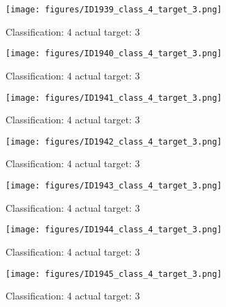 \begin{figure}[h!]
\begin{center}
\texttt{[image: figures/ID1939\_class\_4\_target\_3.png]}
\end{center}
\caption{ Classification: 4 actual target: 3}
\label{fig:ID1939_class_4_target_3}
\end{figure}
\begin{figure}[h!]
\begin{center}
\texttt{[image: figures/ID1940\_class\_4\_target\_3.png]}
\end{center}
\caption{ Classification: 4 actual target: 3}
\label{fig:ID1940_class_4_target_3}
\end{figure}
\begin{figure}[h!]
\begin{center}
\texttt{[image: figures/ID1941\_class\_4\_target\_3.png]}
\end{center}
\caption{ Classification: 4 actual target: 3}
\label{fig:ID1941_class_4_target_3}
\end{figure}
\begin{figure}[h!]
\begin{center}
\texttt{[image: figures/ID1942\_class\_4\_target\_3.png]}
\end{center}
\caption{ Classification: 4 actual target: 3}
\label{fig:ID1942_class_4_target_3}
\end{figure}
\begin{figure}[h!]
\begin{center}
\texttt{[image: figures/ID1943\_class\_4\_target\_3.png]}
\end{center}
\caption{ Classification: 4 actual target: 3}
\label{fig:ID1943_class_4_target_3}
\end{figure}
\begin{figure}[h!]
\begin{center}
\texttt{[image: figures/ID1944\_class\_4\_target\_3.png]}
\end{center}
\caption{ Classification: 4 actual target: 3}
\label{fig:ID1944_class_4_target_3}
\end{figure}
\begin{figure}[h!]
\begin{center}
\texttt{[image: figures/ID1945\_class\_4\_target\_3.png]}
\end{center}
\caption{ Classification: 4 actual target: 3}
\label{fig:ID1945_class_4_target_3}
\end{figure}
